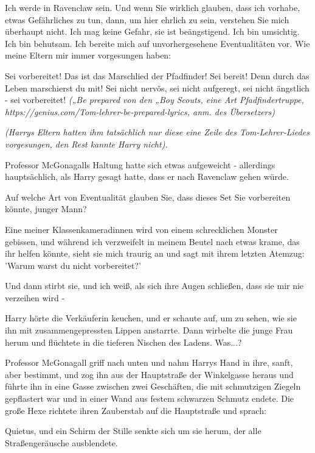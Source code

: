\glqq{}Ich werde in Ravenclaw sein. Und wenn Sie wirklich glauben, dass ich
vorhabe, etwas Gefährliches zu tun, dann, um hier ehrlich zu sein, verstehen Sie
mich überhaupt nicht. Ich mag keine Gefahr, sie ist beängstigend. Ich bin
umsichtig. Ich bin behutsam. Ich bereite mich auf unvorhergesehene
Eventualitäten vor. Wie meine Eltern mir immer vorgesungen haben:

Sei vorbereitet! Das ist das Marschlied der Pfadfinder! Sei bereit! Denn durch
das Leben marschierst du mit! Sei nicht nervös, sei nicht aufgeregt, sei nicht
ängstlich - sei vorbereitet!\grqq{} \emph{(„Be prepared\grqq{} von den „Boy
Scouts\grqq{}, eine Art Pfadfindertruppe,
}\emph{https://genius.com/Tom-lehrer-be-prepared-lyrics}\emph{, anm. des
Übersetzers)}

\emph{(Harrys Eltern hatten ihm tatsächlich nur diese eine Zeile des
Tom-Lehrer-Liedes vorgesungen, den Rest kannte Harry nicht).}

Professor McGonagalls Haltung hatte sich etwas aufgeweicht - allerdings
hauptsächlich, als Harry gesagt hatte, dass er nach Ravenclaw gehen würde.

\glqq{}Auf welche Art von Eventualität glauben Sie, dass dieses Set Sie
vorbereiten könnte, junger Mann?\grqq{}

\glqq{}Eine meiner Klassenkameradinnen wird von einem schrecklichen Monster
gebissen, und während ich verzweifelt in meinem Beutel nach etwas krame, das ihr
helfen könnte, sieht sie mich traurig an und sagt mit ihrem letzten Atemzug:
'Warum warst du nicht vorbereitet?'

Und dann stirbt sie, und ich weiß, als sich ihre Augen schließen, dass sie mir
nie verzeihen wird -\grqq{}

Harry hörte die Verkäuferin keuchen, und er schaute auf, um zu sehen, wie sie
ihn mit zusammengepressten Lippen anstarrte. Dann wirbelte die junge Frau herum
und flüchtete in die tieferen Nischen des Ladens. Was...?

Professor McGonagall griff nach unten und nahm Harrys Hand in ihre, sanft, aber
bestimmt, und zog ihn aus der Hauptstraße der Winkelgasse heraus und führte ihn
in eine Gasse zwischen zwei Geschäften, die mit schmutzigen Ziegeln gepflastert
war und in einer Wand aus festem schwarzen Schmutz endete. Die große Hexe
richtete ihren Zauberstab auf die Hauptstraße und sprach:

\glqq{}Quietus\grqq{}, und ein Schirm der Stille senkte sich um sie herum, der
alle Straßengeräusche ausblendete.

